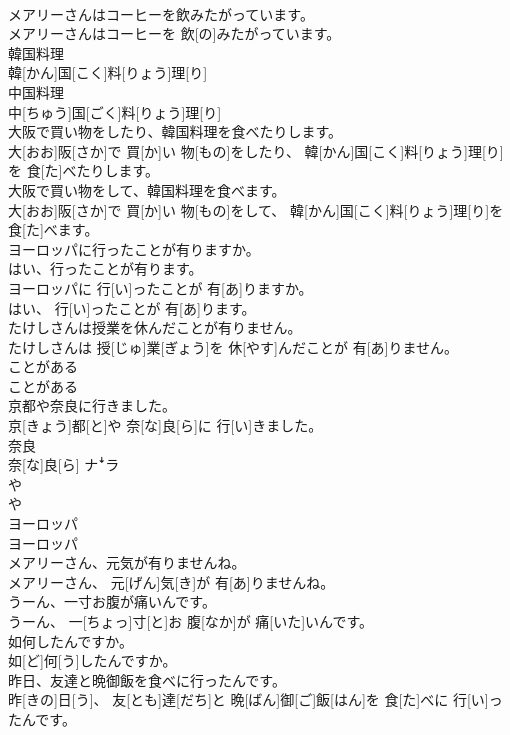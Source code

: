 \documentclass[8pt]{extreport}
\begin{document}
\begin{CJK}{UTF8}{min}
\\	メアリーさんはコーヒーを飲みたがっています。	
\\	メアリーさんはコーヒーを 飲[の]みたがっています。
\\	韓国料理	
\\	韓[かん]国[こく]料[りょう]理[り]	
\\	中国料理	
\\	中[ちゅう]国[ごく]料[りょう]理[り]
\\	大阪で買い物をしたり、韓国料理を食べたりします。	
\\	大[おお]阪[さか]で 買[か]い 物[もの]をしたり、 韓[かん]国[こく]料[りょう]理[り]を 食[た]べたりします。
\\	大阪で買い物をして、韓国料理を食べます。	
\\	大[おお]阪[さか]で 買[か]い 物[もの]をして、 韓[かん]国[こく]料[りょう]理[り]を 食[た]べます。
\\	ヨーロッパに行ったことが有りますか。 
\\	はい、行ったことが有ります。	
\\	ヨーロッパに 行[い]ったことが 有[あ]りますか。 
\\	はい、 行[い]ったことが 有[あ]ります。
\\	たけしさんは授業を休んだことが有りません。	
\\	たけしさんは 授[じゅ]業[ぎょう]を 休[やす]んだことが 有[あ]りません。
\\	ことがある	
\\	ことがある
\\	京都や奈良に行きました。	
\\	京[きょう]都[と]や 奈[な]良[ら]に 行[い]きました。
\\	奈良	
\\	奈[な]良[ら]	ナꜜラ
\\	や
\\	や
\\	ヨーロッパ	
\\	ヨーロッパ
\\	メアリーさん、元気が有りませんね。	
\\	メアリーさん、 元[げん]気[き]が 有[あ]りませんね。
\\	うーん、一寸お腹が痛いんです。	
\\	うーん、 一[ちょっ]寸[と]お 腹[なか]が 痛[いた]いんです。
\\	如何したんですか。	
\\	如[ど]何[う]したんですか。
\\	昨日、友達と晩御飯を食べに行ったんです。	
\\	昨[きの]日[う]、 友[とも]達[だち]と 晩[ばん]御[ご]飯[はん]を 食[た]べに 行[い]ったんです。

\end{CJK}
\end{document}

